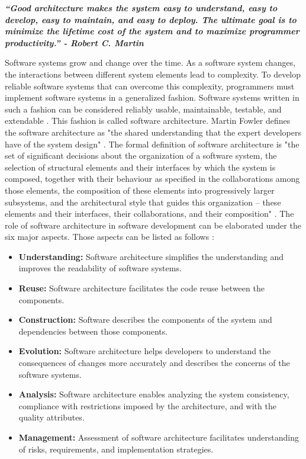 \textbf{\textit{“Good architecture makes the system easy to understand, easy to develop, easy to maintain, and easy to deploy. The ultimate goal is to minimize the lifetime cost of the system and to maximize programmer productivity.” - Robert C. Martin}} \cite{10}

Software systems grow and change over the time. As a software system changes, the interactions between different system elements lead to complexity. To develop reliable software systems that can overcome this complexity, programmers must implement software systems in a generalized fashion. Software systems written in such a fashion can be considered reliably usable, maintainable, testable, and extendable \cite{15}. This fashion is called software architecture. Martin Fowler defines the software architecture as "the shared understanding that the expert developers have of the system design" \cite{16}. The formal definition of software architecture is "the set of significant decisions about the organization of a software system, the selection of structural elements and their interfaces by which the system is composed, together with their behaviour as specified in the collaborations among those elements, the composition of these elements into progressively larger subsystems, and the architectural style that guides this organization -- these elements and their interfaces, their collaborations, and their composition" \cite{17}. The role of software architecture in software development can be elaborated under the six major aspects. Those aspects can be listed as follows \cite{25}:
\begin{itemize}
    \item \textbf{Understanding:} Software architecture simplifies the understanding and improves the readability of software systems.
    \item \textbf{Reuse:} Software architecture facilitates  the code reuse between the components.
    \item \textbf{Construction:} Software describes the components of the system and dependencies between those components.
    \item \textbf{Evolution:} Software architecture helps developers to understand the consequences of changes more accurately and describes the concerns of the software systems.
    \item \textbf{Analysis:} Software architecture enables analyzing the system consistency, compliance with restrictions imposed by the architecture, and with the quality attributes.
    \item \textbf{Management:} Assessment of software architecture facilitates understanding of risks, requirements, and implementation strategies.
\end{itemize}

